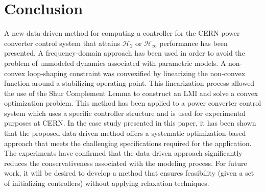 \documentclass[a4paper, 10pt, conference]{ieeeconf}
\begin{document}
\section{Conclusion}
\label{sec:conclusion}
A new data-driven method for computing a controller for the CERN power converter control system that attains $\mathcal{H}_2$ or $\mathcal{H}_{\infty}$ performance has been presented. A frequency-domain approach has been used in order to avoid the problem of unmodeled dynamics associated with parametric models. A non-convex loop-shaping constraint was convexified by linearizing the non-convex function around a stabilizing operating point. This linearization process allowed the use of the Shur Complement Lemma to construct an LMI and solve a convex optimization problem. This method has been applied to a power converter control system which uses a specific controller structure and is used for experimental purposes at CERN. In the case study presented in this paper, it has been shown that the proposed data-driven method offers a systematic optimization-based approach that meets the challenging specifications required for the application. The experiments have confirmed that the data-driven approach significantly reduces the conservativeness associated with the modeling process. For future work, it will be desired to develop a method that ensures feasibility (given a set of initializing controllers) without applying relaxation techniques. 



\end{document}
